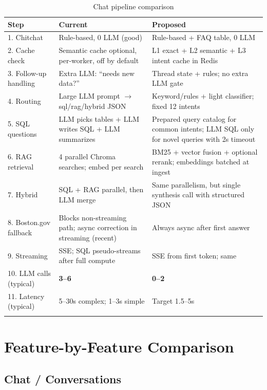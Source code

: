 \documentclass[11pt,a4paper]{article}
\begin{document}
\begin{longtable}{@{}p{3cm}p{5.4cm}p{5.4cm}@{}}
\toprule
\textbf{Step} & \textbf{Current} & \textbf{Proposed} \\
\midrule
\endhead
1. Chitchat & Rule-based, 0 LLM (good) & Rule-based + FAQ table, 0 LLM \\
2. Cache check & Semantic cache optional, per-worker, off by default & L1 exact + L2 semantic + L3 intent cache in Redis \\
3. Follow-up handling & Extra LLM: ``needs new data?'' & Thread state + rules; no extra LLM gate \\
4. Routing & Large LLM prompt $\rightarrow$ sql/rag/hybrid JSON & Keyword/rules + light classifier; fixed 12 intents \\
5. SQL questions & LLM picks tables + LLM writes SQL + LLM summarizes & Prepared query catalog for common intents; LLM SQL only for novel queries with 2s timeout \\
6. RAG retrieval & 4 parallel Chroma searches; embed per search & BM25 + vector fusion + optional rerank; embeddings batched at ingest \\
7. Hybrid & SQL + RAG parallel, then LLM merge & Same parallelism, but single synthesis call with structured JSON \\
8. Boston.gov fallback & Blocks non-streaming path; async correction in streaming (recent) & Always async after first answer \\
9. Streaming & SSE; SQL pseudo-streams after full compute & SSE from first token; same \\
10. LLM calls (typical) & \textbf{3--6} & \textbf{0--2} \\
11. Latency (typical) & 5--30s complex; 1--3s simple & Target 1.5--5s \\
\bottomrule
\caption{Chat pipeline comparison}
\end{longtable}

\section{Feature-by-Feature Comparison}

\subsection{Chat / Conversations}
\end{document}
